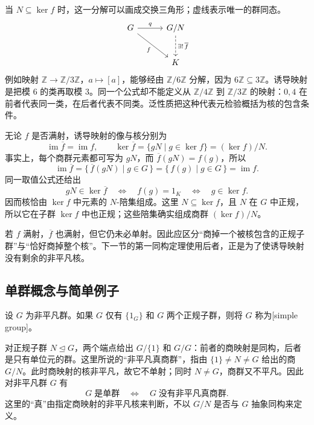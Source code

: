 当 \(N\subseteq\ker f\) 时，这一分解可以画成交换三角形；虚线表示唯一的群同态。
\[
	\begin{tikzcd}[column sep=3em,row sep=2.5em]
		G\arrow[r,"q"]\arrow[dr,"f"']&G/N\arrow[d,dashed,"\exists!\,\overline f"]\\
		&K
	\end{tikzcd}
\]
例如映射 \(\mathbb Z\rightarrow\mathbb Z/3\mathbb Z\)，\(a\mapsto[a]\)，能够经由 \(\mathbb Z/6\mathbb Z\) 分解，因为 \(6\mathbb Z\subseteq3\mathbb Z\)。诱导映射是把模 \(6\) 的类再取模 \(3\)。同一个公式却不能定义从 \(\mathbb Z/4\mathbb Z\) 到 \(\mathbb Z/3\mathbb Z\) 的映射：\(0,4\) 在前者代表同一类，在后者代表不同类。泛性质把这种代表元检验概括为核的包含条件。

\ProseParagraphBreak
无论 \(f\) 是否满射，诱导映射的像与核分别为
\[
	\operatorname{im}\overline f=\operatorname{im}f,\qquad \ker\overline f=\{gN\mid g\in\ker f\}=(\ker f)/N.
\]
事实上，每个商群元素都可写为 \(gN\)，而 \(\overline f(gN)=f(g)\)，所以
\[
	\operatorname{im}\overline f =\{\,\overline f(gN)\mid g\in G\,\} =\{\,f(g)\mid g\in G\,\}=\operatorname{im}f.
\]
同一取值公式还给出
\[
	gN\in\ker\overline f\quad\Longleftrightarrow\quad f(g)=1_K\quad\Longleftrightarrow\quad g\in\ker f.
\]
因而核恰由 \(\ker f\) 中元素的 \(N\)-陪集组成。这里 \(N\subseteq\ker f\)，且 \(N\) 在 \(G\) 中正规，所以它在子群 \(\ker f\) 中也正规；这些陪集确实组成商群 \((\ker f)/N\)。

\ProseParagraphBreak
若 \(f\) 满射，\(\overline f\) 也满射，但它仍未必单射。因此应区分“商掉一个被核包含的正规子群”与“恰好商掉整个核”。下一节的第一同构定理使用后者，正是为了使诱导映射没有剩余的非平凡核。

\subsection{单群概念与简单例子}
\label{b1:subsec:0203:03}

\begin{definition}\label{b1:def:simple-group}
	设 \(G\) 为非平凡群。如果 \(G\) 仅有 \(\{1_G\}\) 和 \(G\) 两个正规子群，则将 \(G\) 称为[simple group]。
\end{definition}

对正规子群 \(N\trianglelefteq G\)，两个端点给出 \(G/\{1\}\) 和 \(G/G\)：前者的商映射是同构，后者是只有单位元的群。这里所说的“非平凡真商群”，指由 \(\{1\}\ne N\ne G\) 给出的商 \(G/N\)。此时商映射的核非平凡，故它不单射；同时 \(N\ne G\)，商群又不平凡。因此对非平凡群 \(G\) 有
\[
	G\;\text{是单群}\quad\Longleftrightarrow\quad G\;\text{没有非平凡真商群}.
\]
这里的“真”由指定商映射的非平凡核来判断，不以 \(G/N\) 是否与 \(G\) 抽象同构来定义。

